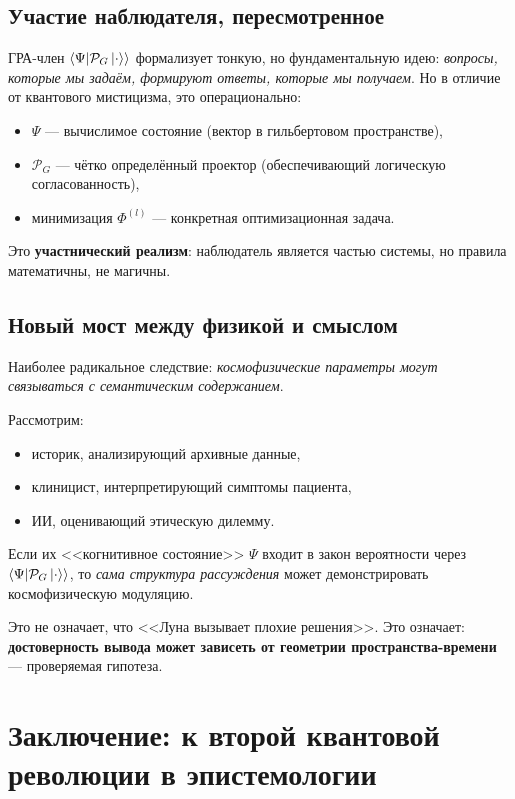 \documentclass[12pt,a4paper]{article}
\theoremstyle{plain}
\theoremstyle{definition}
\theoremstyle{remark}
\newcommand{\cP}{\mathcal{P}}
\newcommand{\inner}[2]{\left\langle #1 \middle| #2 \right\rangle}
\begin{document}
\subsection{Участие наблюдателя, пересмотренное}
ГРА-член $\inner{\Psi}{\cP_G \ket{\cdot}}$ формализует тонкую, но фундаментальную идею: \emph{вопросы, которые мы задаём, формируют ответы, которые мы получаем}. Но в отличие от квантового мистицизма, это операционально:
\begin{itemize}
    \item $\Psi$ --- вычислимое состояние (вектор в гильбертовом пространстве),
    \item $\cP_G$ --- чётко определённый проектор (обеспечивающий логическую согласованность),
    \item минимизация $\Phi^{(l)}$ --- конкретная оптимизационная задача.
\end{itemize}
Это \textbf{участнический реализм}: наблюдатель является частью системы, но правила математичны, не магичны.

\subsection{Новый мост между физикой и смыслом}
Наиболее радикальное следствие: \emph{космофизические параметры могут связываться с семантическим содержанием}.

Рассмотрим:
\begin{itemize}
    \item историк, анализирующий архивные данные,
    \item клиницист, интерпретирующий симптомы пациента,
    \item ИИ, оценивающий этическую дилемму.
\end{itemize}
Если их <<когнитивное состояние>> $\Psi$ входит в закон вероятности через $\inner{\Psi}{\cP_G \ket{\cdot}}$, то \emph{сама структура рассуждения} может демонстрировать космофизическую модуляцию.

Это не означает, что <<Луна вызывает плохие решения>>. Это означает: \textbf{достоверность вывода может зависеть от геометрии пространства-времени} --- проверяемая гипотеза.

\section{Заключение: к второй квантовой революции в эпистемологии}
\label{sec:conclusion}
\end{document}
